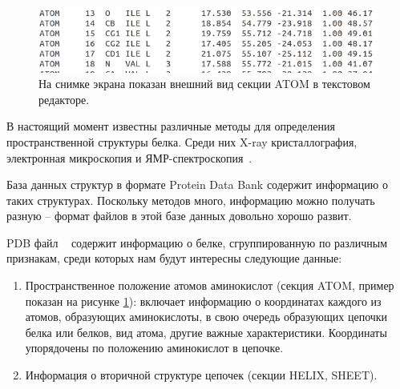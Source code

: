 \begin{figure}
\includegraphics[width=\linewidth]{atom_in_pdb.png}
\caption{\small{На снимке экрана показан внешний вид секции ATOM в текстовом редакторе.
 }}
\label{fig:atom_in_pdb}
\end{figure}
В настоящий момент известны различные методы для определения пространственной структуры белка. Среди них X-ray кристаллография, электронная микроскопия и ЯМР-спектроскопия~\cite{konf_analiz_belkov}.

База данных структур в формате Protein Data Bank\cite{rcsb} содержит информацию о таких структурах. Поскольку методов много, информацию можно получать разную -- формат файлов в этой базе данных довольно хорошо развит.

PDB файл ~\cite{pdb} содержит информацию о белке, сгруппированную по различным признакам, среди которых нам будут интересны следующие данные: 
\begin{enumerate}
\item Пространственное положение атомов аминокислот (секция ATOM, пример показан на рисунке \ref{fig:atom_in_pdb}):
включает информацию о координатах каждого из атомов, образующих аминокислоты, в свою очередь образующих цепочки белка или белков, вид атома, другие важные характеристики. Координаты упорядочены по положению аминокислот в цепочке.

\item Информация о вторичной структуре цепочек (секции HELIX, SHEET).
\end{enumerate}





